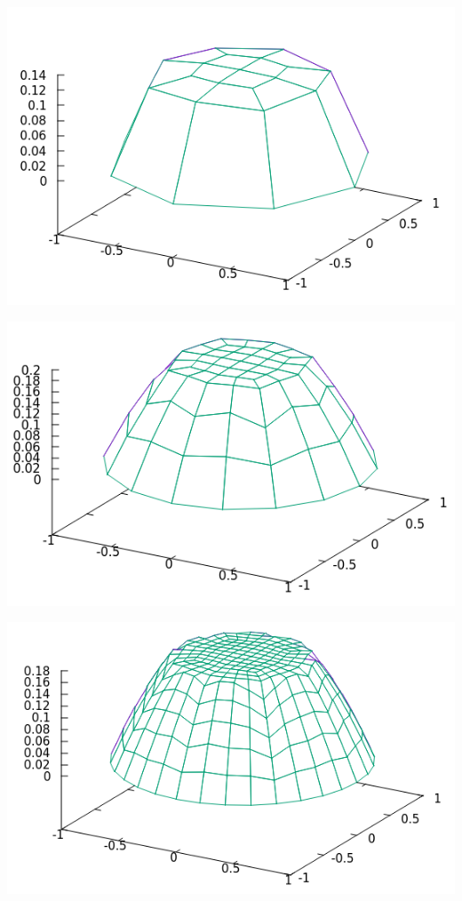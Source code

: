 \documentclass[9pt]{beamer}
\begin{document}
\begin{frame}
\begin{minipage}{.45\paperwidth}
	\centering
	\includegraphics[scale=.5]{Solu3-0.png}
\end{minipage}%
\begin{minipage}{.4\paperwidth}
	\centering
	\includegraphics[scale=.5]{Solu3-1.png}
\end{minipage}
\begin{minipage}{.45\paperwidth}
	\centering
	\includegraphics[scale=.5]{Solu3-2.png}

\end{minipage}
\end{frame}
\end{document}
